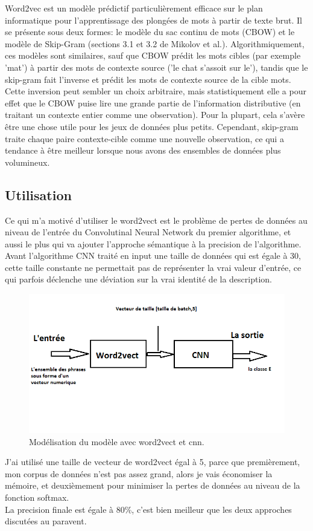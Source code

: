 Word2vec est un modèle prédictif particulièrement efficace sur le plan informatique pour l'apprentissage des plongées de mots à partir de texte brut. Il se présente sous deux formes: le modèle du sac continu de mots (CBOW) et le modèle de Skip-Gram (sections 3.1 et 3.2 de Mikolov et al.). Algorithmiquement, ces modèles sont similaires, sauf que CBOW prédit les mots cibles (par exemple 'mat') à partir des mots de contexte source ('le chat s'assoit sur le'), tandis que le skip-gram fait l'inverse et prédit les mots de contexte source de la cible mots. Cette inversion peut sembler un choix arbitraire, mais statistiquement elle a pour effet que le CBOW puise lire une grande partie de l'information distributive (en traitant un contexte entier comme une observation). Pour la plupart, cela s'avère être une chose utile pour les jeux de données plus petits. Cependant, skip-gram traite chaque paire contexte-cible comme une nouvelle observation, ce qui a tendance à être meilleur lorsque nous avons des ensembles de données plus volumineux.
\subsection{Utilisation}
Ce qui m'a motivé d'utiliser le word2vect est le problème de pertes de données au niveau de l'entrée du Convolutinal Neural Network du premier algorithme, et aussi le plus qui va ajouter l'approche sémantique à la precision de l'algorithme.\\
Avant l'algorithme CNN traité en input une taille de données qui est égale à 30, cette taille constante ne permettait pas de représenter la vrai valeur d'entrée, ce qui parfois déclenche une déviation sur la vrai identité de la description.\\[0.5cm]
\begin{figure}[H]
	\begin{center}
	\includegraphics[width=\linewidth]{Images/w2vcnn.png}
	\end{center}
	\caption{Modélisation du modèle avec word2vect et cnn.}
	\label{fig:rnn}
\end{figure}
J'ai utilisé une taille de vecteur de word2vect égal à 5, parce que premièrement, mon corpus de données n'est pas assez grand, alors je vais économiser la mémoire, et deuxièmement pour minimiser la pertes de données au niveau de la fonction softmax.\\
La precision finale est égale à 80\%, c'est bien meilleur que les deux approches discutées au paravent.




